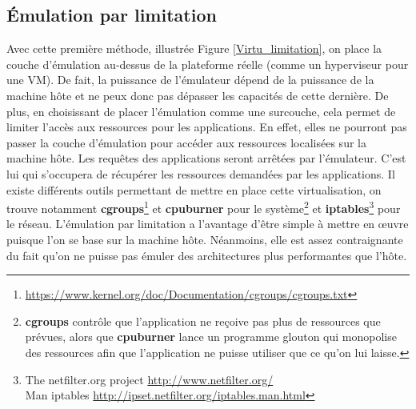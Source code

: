 \subsection{Émulation par limitation}
\label{section:limitation}

Avec cette première méthode, illustrée Figure \ref{Virtu_limitation}, on place
la couche d'émulation au-dessus de la plateforme réelle (comme un hyperviseur
pour une VM). De fait, la puissance de l'émulateur dépend de la puissance de la
machine hôte et ne peux donc pas dépasser les capacités de cette dernière. De
plus, en choisissant de placer l'émulation comme une surcouche, cela permet de
limiter l'accès aux ressources pour les applications. En effet, elles ne
pourront pas passer la couche d'émulation pour accéder aux ressources localisées
sur la machine hôte. Les requêtes des applications seront arrêtées par
l'émulateur. C'est lui qui s'occupera de récupérer les ressources demandées par
les applications. Il existe différents outils permettant de mettre en place
cette virtualisation, on trouve notamment
\textbf{cgroups}\footnote{\url{https://www.kernel.org/doc/Documentation/cgroups/cgroups.txt}}
et \textbf{cpuburner} \citep{canon2006wrekavoc, buchert2011methods} pour le
système\footnote{\textbf{cgroups} contrôle que l'application ne reçoive pas plus
  de ressources que prévues, alors que \textbf{cpuburner} lance un programme
  glouton qui monopolise des ressources afin que l'application ne puisse
  utiliser que ce qu'on lui laisse.} et \textbf{iptables}\footnote{The netfilter.org project \url{http://www.netfilter.org/} \\ Man iptables \url{http://ipset.netfilter.org/iptables.man.html}} pour le réseau. L'émulation par
limitation a l'avantage d'être simple à mettre en \oe uvre puisque l'on se base
sur la machine hôte. Néanmoins, elle est assez contraignante du fait qu'on ne
puisse pas émuler des architectures plus performantes que l'hôte.


